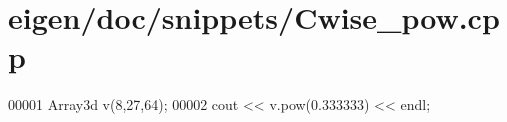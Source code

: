 \hypertarget{eigen_2doc_2snippets_2_cwise__pow_8cpp_source}{}\section{eigen/doc/snippets/\+Cwise\+\_\+pow.cpp}
\label{eigen_2doc_2snippets_2_cwise__pow_8cpp_source}

\begin{DoxyCode}
00001 Array3d v(8,27,64);
00002 cout << v.pow(0.333333) << endl;
\end{DoxyCode}
